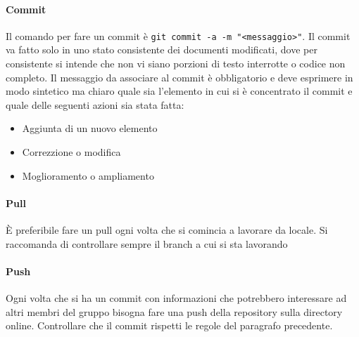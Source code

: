 \documentclass[12pt,a4paper]{article}
\begin{document}
\paragraph{Commit}
Il comando per fare un commit è \texttt{git commit -a -m "<messaggio>"}. Il commit va fatto solo in uno stato consistente dei documenti modificati, dove per consistente si intende che non vi siano porzioni di testo interrotte o codice non completo. Il messaggio da associare al commit è obbligatorio e deve esprimere in modo sintetico ma chiaro quale sia l'elemento in cui si è concentrato il commit e quale delle seguenti azioni sia stata fatta:
\begin{itemize}
\item Aggiunta di un nuovo elemento
\item Correzzione o modifica
\item Moglioramento o ampliamento
\end{itemize}
\paragraph{Pull}
È preferibile fare un pull ogni volta che si comincia a lavorare da locale. Si raccomanda di controllare sempre il branch a cui si sta lavorando
\paragraph{Push}
Ogni volta che si ha un commit con informazioni che potrebbero interessare ad altri membri del gruppo bisogna fare una push della repository sulla directory online. Controllare che il commit rispetti le regole del paragrafo precedente.
\end{document}
